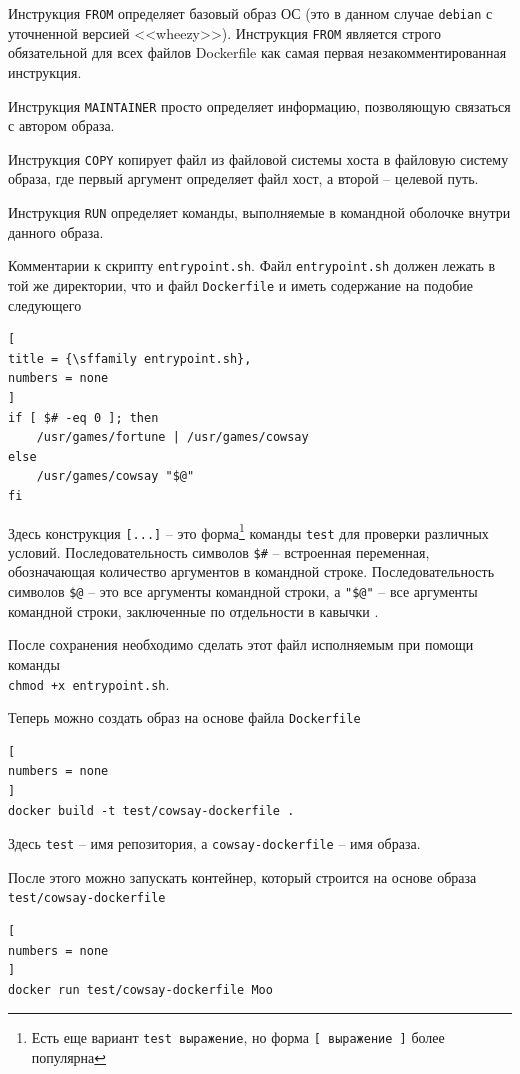 \documentclass[%
	11pt,
	a4paper,
	utf8,
		]{article}
\begin{document}
Инструкция \texttt{FROM} определяет базовый образ ОС (это в данном случае \texttt{debian} с уточненной версией <<wheezy>>). Инструкция \texttt{FROM} является строго обязательной для всех файлов Dockerfile как самая первая незакомментированная инструкция.

Инструкция \texttt{MAINTAINER} просто определяет информацию, позволяющую связаться с автором образа.

Инструкция \texttt{COPY} копирует файл из файловой системы хоста в файловую систему образа, где первый аргумент определяет файл хост, а второй -- целевой путь.

Инструкция \texttt{RUN} определяет команды, выполняемые в командной оболочке внутри данного образа.

Комментарии к скрипту \texttt{entrypoint.sh}. Файл \texttt{entrypoint.sh} должен лежать в той же директории, что и файл \texttt{Dockerfile} и иметь содержание на подобие следующего
\begin{lstlisting}[
title = {\sffamily entrypoint.sh},
numbers = none
]
if [ $# -eq 0 ]; then
    /usr/games/fortune | /usr/games/cowsay
else
    /usr/games/cowsay "$@"
fi
\end{lstlisting}

Здесь конструкция \texttt{[...]} -- это форма\footnote{Есть еще вариант \texttt{test выражение}, но форма \texttt{[ выражение ]} более популярна} команды \texttt{test} для проверки различных условий. Последовательность символов \texttt{\$\#} -- встроенная переменная, обозначающая количество аргументов в командной строке. Последовательность символов \texttt{\$@} -- это все аргументы командной строки, а \texttt{"\$@"} -- все аргументы командной строки, заключенные по отдельности в кавычки \cite[]{robbins:bash-2017}.

После сохранения необходимо сделать этот файл исполняемым при помощи команды\\ \texttt{chmod +x entrypoint.sh}.

Теперь можно создать образ на основе файла \texttt{Dockerfile}
\begin{lstlisting}[
numbers = none
]
docker build -t test/cowsay-dockerfile .
\end{lstlisting}

Здесь \texttt{test} -- имя репозитория, а \texttt{cowsay-dockerfile} -- имя образа.

После этого можно запускать контейнер, который строится на основе образа \verb|test/cowsay-dockerfile|
\begin{lstlisting}[
numbers = none
]
docker run test/cowsay-dockerfile Moo
\end{lstlisting}
\end{document}
